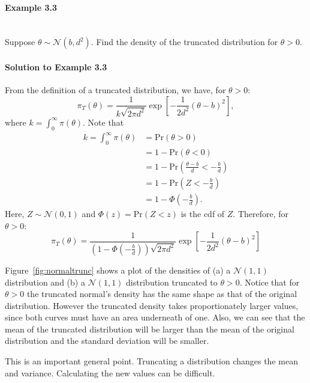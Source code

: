\paragraph{Example 3.3}{~\\
Suppose $\theta \sim \mathcal{N}(b,d^2)$.
Find the density of the truncated distribution for $\theta>0$.



\paragraph{Solution to Example 3.3}{
    
    From the definition of a truncated distribution, we have, for $\theta >0$:
    $$ \pi_T(\theta) = \frac{1}{k \sqrt{2\pi d^2}}\exp\left[-\frac{1}{2d^2}(\theta - b)^2\right], $$
    where $k = \int_0^\infty \pi(\theta).$ Note that 
    \begin{align*}
       k = \int_0^\infty \pi(\theta) &= \text{Pr}(\theta > 0) \\
       &= 1 - \text{Pr}(\theta < 0) \\
       &= 1 - \text{Pr}\left(\frac{\theta - b}{d} < -\frac{b}{d}\right) \\
       &= 1 - \text{Pr}\left(Z < -\frac{b}{d} \right) \\
       &= 1 - \Phi\left(-\frac{b}{d}\right).
    \end{align*}
    Here, $Z \sim \mathcal{N}(0,1)$ and $\Phi(z) = \text{Pr}(Z < z)$ is the cdf of $Z$. Therefore, for $\theta > 0$:
    $$\pi_T(\theta)  = \frac{1}{\left(1 - \Phi\left(-\frac{b}{d}\right)\right) \sqrt{2\pi d^2}}\exp\left[-\frac{1}{2d^2}(\theta - b)^2\right] $$
    
    
}}

Figure~\ref{fig:normaltrunc} shows a plot of the densities of (a) a $\mathcal{N}(1,1)$
distribution and (b) a $\mathcal{N}(1,1)$ distribution truncated to $\theta>0$.
Notice that for $\theta>0$ the truncated normal's density
has the same shape as that of the original distribution.
However the truncated density takes proportionately larger values,
since both curves must have an area underneath of one.
Also, we can see that the mean of the truncated distribution will be larger than the mean of the original distribution and the standard deviation will be smaller.

This is an important general point.
Truncating a distribution changes the mean and variance.
Calculating the new values can be difficult.

